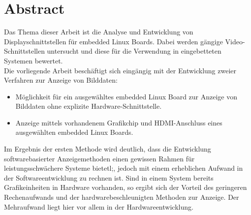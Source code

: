 \section*{Abstract}
\label{sec:Abstract}
Das Thema dieser Arbeit ist die Analyse und  Entwicklung von Displayschnittstellen für embedded Linux Boards. Dabei werden gängige Video-Schnittstellen untersucht und diese für die Verwendung in eingebetteten Systemen bewertet.\\
Die vorliegende Arbeit beschäftigt sich eingängig mit der Entwicklung zweier Verfahren zur Anzeige von Bilddaten:
\begin{itemize}
\item Möglichkeit für ein ausgewähltes embedded Linux Board zur Anzeige von Bilddaten ohne explizite Hardware-Schnittstelle.
\item Anzeige mittels vorhandenem Grafikchip und HDMI-Anschluss eines ausgewählten embedded Linux Boards.
\end{itemize}
Im Ergebnis der ersten Methode wird deutlich, dass die Entwicklung softwarebasierter Anzeigemethoden einen gewissen Rahmen für leistungsschwächere Systeme bietetl;, jedoch mit einem erheblichen Aufwand in der Softwareentwicklung zu rechnen ist. Sind in einem System bereits Grafikeinheiten in Hardware vorhanden, so ergibt sich der Vorteil des geringeren Rechenaufwands und der hardwarebeschleunigten Methoden zur Anzeige. Der Mehraufwand liegt hier vor allem in der Hardwareentwicklung.
